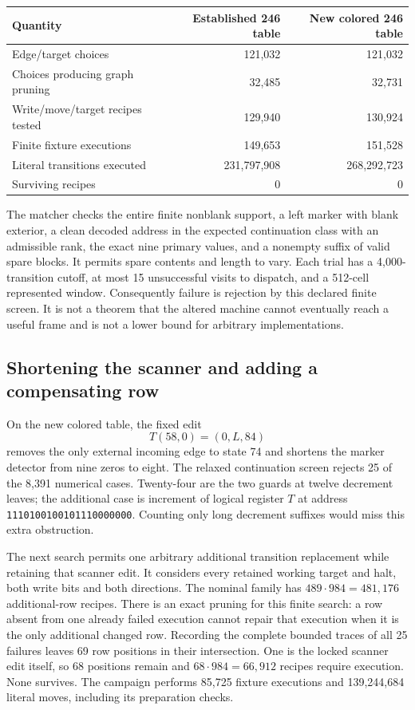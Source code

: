 \begin{center}
\begin{tabular}{lrr}
\hline
Quantity & Established 246 table & New colored 246 table\\
\hline
Edge/target choices & 121,032 & 121,032\\
Choices producing graph pruning & 32,485 & 32,731\\
Write/move/target recipes tested & 129,940 & 130,924\\
Finite fixture executions & 149,653 & 151,528\\
Literal transitions executed & 231,797,908 & 268,292,723\\
Surviving recipes & 0 & 0\\
\hline
\end{tabular}
\end{center}

The matcher checks the entire finite nonblank support, a left marker
with blank exterior, a clean decoded address in the expected continuation
class with an admissible rank, the exact nine primary values, and a
nonempty suffix of valid spare blocks. It permits spare contents and
length to vary. Each trial has a 4,000-transition cutoff, at most 15
unsuccessful visits to dispatch, and a 512-cell represented window.
Consequently failure is rejection by this declared finite screen. It is
not a theorem that the altered machine cannot eventually reach a useful
frame and is not a lower bound for arbitrary implementations.

\subsection{Shortening the scanner and adding a compensating row}

On the new colored table, the fixed edit
\[
 T(58,0)=(0,L,84)
\]
removes the only external incoming edge to state 74 and shortens the
marker detector from nine zeros to eight. The relaxed continuation
screen rejects 25 of the 8,391 numerical cases. Twenty-four are the two
guards at twelve decrement leaves; the additional case is increment of
logical register $T$ at address
\texttt{1110100100101110000000}. Counting only long decrement suffixes
would miss this extra obstruction.

The next search permits one arbitrary additional transition replacement
while retaining that scanner edit. It considers every retained working
target and halt, both write bits and both directions. The nominal family
has $489\cdot984=481,176$ additional-row recipes. There is an exact pruning
for this finite search: a row absent from one already failed execution
cannot repair that execution when it is the only additional changed row.
Recording the complete bounded traces of all 25 failures leaves 69 row
positions in their intersection. One is the locked scanner edit itself,
so 68 positions remain and $68\cdot984=66,912$ recipes require execution.
None survives. The campaign performs 85,725 fixture executions and
139,244,684 literal moves, including its preparation checks.


